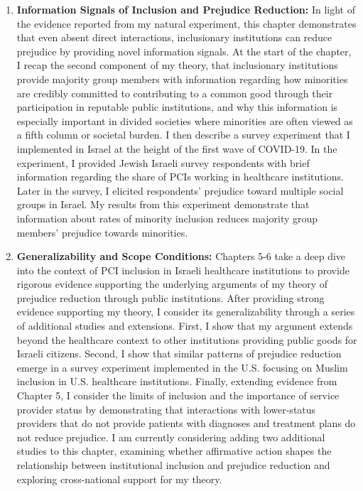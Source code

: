 \documentclass[12pt]{article}
\theoremstyle{plain}
\begin{document}
\begin{enumerate}
\item \textbf{Information Signals of Inclusion and Prejudice Reduction:} In light of the evidence reported from my natural experiment, this chapter demonstrates that even absent direct interactions, inclusionary institutions can reduce prejudice by providing novel information signals. At the start of the chapter, I recap the second component of my theory, that inclusionary institutions provide majority group members with information regarding how minorities are credibly committed to contributing to a common good through their participation in reputable public institutions, and why this information is especially important in divided societies where minorities are often viewed as a fifth column or societal burden. I then describe a survey experiment that I implemented in Israel at the height of the first wave of COVID-19. In the experiment, I provided Jewish Israeli survey respondents with brief information regarding the share of PCIs working in healthcare institutions. Later in the survey, I elicited respondents' prejudice toward multiple social groups in Israel. My results from this experiment demonstrate that information about rates of minority inclusion reduces majority group members' prejudice towards minorities. 



\item \textbf{Generalizability and Scope Conditions:} Chapters 5-6 take a deep dive into the context of PCI inclusion in Israeli healthcare institutions to provide rigorous evidence supporting the underlying arguments of my theory of prejudice reduction through public institutions. After providing strong evidence supporting my theory, I consider its generalizability through a series of additional studies and extensions. First, I show that my argument extends beyond the healthcare context to other institutions providing public goods for Israeli citizens. Second, I show that similar patterns of prejudice reduction emerge in a survey experiment implemented in the U.S. focusing on Muslim inclusion in U.S. healthcare institutions. Finally, extending evidence from Chapter 5, I consider the limits of inclusion and the importance of service provider status by demonstrating that interactions with lower-status providers that do not provide patients with diagnoses and treatment plans do not reduce prejudice. I am currently considering adding two additional studies to this chapter, examining whether affirmative action shapes the relationship between institutional inclusion and prejudice reduction and exploring cross-national support for my theory.


\end{enumerate}
\end{document}
